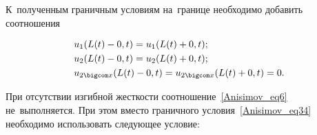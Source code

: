 К~полученным граничным условиям на~границе необходимо добавить соотношения

\begin{equation}\label{Anisimov_eq35}

\begin{split}

&u_1(L(t)-0, t)=u_1(L(t)+0, t);

\\

& u_2(L(t)-0, t)=u_2(L(t)+0, t);\\

&

u_{2 \bigcom x}(L(t)-0, t)=u_{2 \bigcom x}(L(t)+0, t)=0.

\end{split}

\end{equation}



При отсутствии изгибной жесткости соотношение~\eqref{Anisimov_eq6} не~выполняется. При этом вместо граничного условия~\eqref{Anisimov_eq34} необходимо использовать следующее условие:

